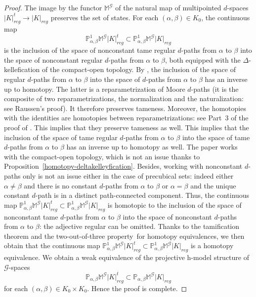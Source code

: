 \documentclass[a4paper,12pt]{amsart}
\newcommand{\p}{\times}
\renewcommand{\P}{\mathbb{P}}
\newcommand{\bpf}{\begin{proof}}
\newcommand{\epf}{\end{proof}}
\theoremstyle{definition}
\newcommand{\moore}{{\mathbb{M}}}
\newcommand{\ttt}{two-out-of-three property}
\renewcommand{\P}{\mathbb{P}}
\begin{document}
\bpf
The image by the functor $\moore^{\mathcal{G}}$ of the natural map of multipointed $d$-spaces $|K|^t_{reg} \to |K|_{reg}$ preserves the set of states. For each $(\alpha,\beta)\in K_0$, the continuous map \[\P_{\alpha,\beta}^1\moore^{\mathcal{G}}|K|^t_{reg} \subset \P_{\alpha,\beta}^1\moore^{\mathcal{G}}|K|_{reg}\] is the inclusion of the space of nonconstant tame regular $d$-paths from $\alpha$ to $\beta$ into the space of nonconstant regular $d$-paths from $\alpha$ to $\beta$, both equipped with the $\Delta$-kellefication of the compact-open topology. By \cite[Proposition~2.16]{MR2521708}, the inclusion of the space of regular $d$-paths from $\alpha$ to $\beta$ into the space of $d$-paths from $\alpha$ to $\beta$ has an inverse up to homotopy. The latter is a reparametrization of Moore $d$-paths (it is the composite of two reparametrizations, the normalization and the naturalization: see Raussen's proof). It therefore preserves tameness. Moreover, the homotopies with the identities are homotopies between reparametrizations: see Part~3 of the proof of \cite[Proposition~2.16]{MR2521708}. This implies that they preserve tameness as well. This implies that the inclusion of the space of tame regular $d$-paths from $\alpha$ to $\beta$ into the space of tame $d$-paths from $\alpha$ to $\beta$ has an inverse up to homotopy as well. The paper \cite{MR2521708} works with the compact-open topology, which is not an issue thanks to Proposition~\ref{homotopy-deltakelleyfication}. Besides, working with nonconstant $d$-paths only is not an issue either in the case of precubical sets: indeed either $\alpha\neq \beta$ and there is no constant $d$-paths from $\alpha$ to $\beta$ or $\alpha=\beta$ and the unique constant $d$-path is in a distinct path-connected component. Thus, the continuous map $\P_{\alpha,\beta}^1\moore^{\mathcal{G}}|K|^t_{reg} \subset \P_{\alpha,\beta}^1\moore^{\mathcal{G}}|K|_{reg}$ is homotopic to the inclusion of the space of nonconstant tame $d$-paths from $\alpha$ to $\beta$ into the space of nonconstant $d$-paths from $\alpha$ to $\beta$: the adjective regular can be omitted. Thanks to the tamification theorem \cite[Theorem~6.1]{MR4070250} and the \ttt\  for homotopy equivalences, we then obtain that the continuous map $\P_{\alpha,\beta}^1\moore^{\mathcal{G}}|K|^t_{reg} \subset \P_{\alpha,\beta}^1\moore^{\mathcal{G}}|K|_{reg}$ is a homotopy equivalence. We obtain a weak equivalence of the projective h-model structure of $\mathcal{G}$-spaces \[\P_{\alpha,\beta}\moore^{\mathcal{G}}|K|^t_{reg} \subset \P_{\alpha,\beta}\moore^{\mathcal{G}}|K|_{reg}\] for each $(\alpha,\beta)\in K_0\p K_0$. Hence the proof is complete.
\epf
\end{document}
